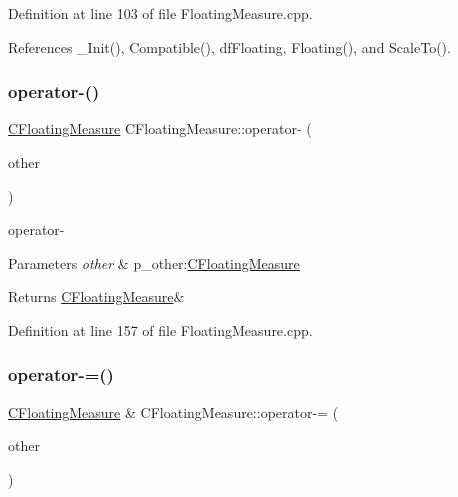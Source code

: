 Definition at line 103 of file Floating\+Measure.\+cpp.



References \+\_\+\+Init(), Compatible(), df\+Floating, Floating(), and Scale\+To().

\mbox{\label{classCFloatingMeasure_ad29973f56a38dda22fc9d66a16b13860}} 
\subsubsection{\texorpdfstring{operator-\/()}{operator-()}}
{\footnotesize\ttfamily \hyperlink{classCFloatingMeasure}{C\+Floating\+Measure} C\+Floating\+Measure\+::operator-\/ (\begin{DoxyParamCaption}\item[{const \hyperlink{classCFloatingMeasure}{C\+Floating\+Measure} \&}]{other }\end{DoxyParamCaption})}



operator-\/ 


\begin{DoxyParams}{Parameters}
{\em other} & p\+\_\+other\+:\hyperlink{classCFloatingMeasure}{C\+Floating\+Measure} \\
\hline
\end{DoxyParams}
\begin{DoxyReturn}{Returns}
\hyperlink{classCFloatingMeasure}{C\+Floating\+Measure}\& 
\end{DoxyReturn}


Definition at line 157 of file Floating\+Measure.\+cpp.

\mbox{\label{classCFloatingMeasure_a3661f71ed47a6659f7e27adff3c5c369}} 
\subsubsection{\texorpdfstring{operator-\/=()}{operator-=()}}
{\footnotesize\ttfamily \hyperlink{classCFloatingMeasure}{C\+Floating\+Measure} \& C\+Floating\+Measure\+::operator-\/= (\begin{DoxyParamCaption}\item[{const \hyperlink{classCFloatingMeasure}{C\+Floating\+Measure} \&}]{other }\end{DoxyParamCaption})}



